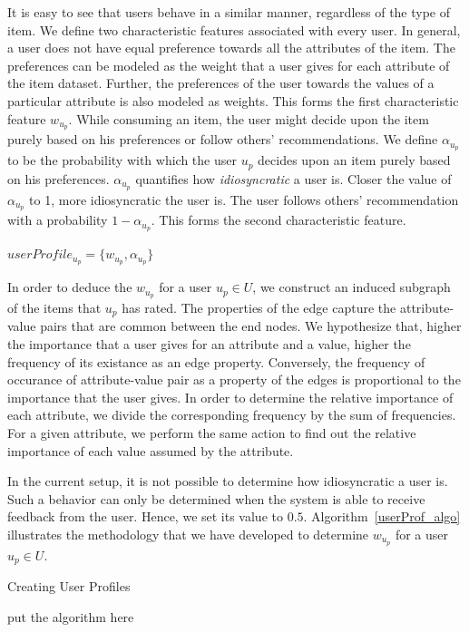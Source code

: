\documentclass{acm_proc_article-sp}
\begin{document}
It is easy to see that users behave in a similar manner, regardless of the type of item. We define two characteristic features associated with every user. In general, a user does not have equal preference towards all the attributes of the item. The preferences can be modeled as the weight that a user gives for each attribute of the item dataset. Further, the preferences of the user towards the values of a particular attribute is also modeled as weights. This forms the first characteristic feature $w_{u_p}$. While consuming an item, the user might decide upon the item purely based on his preferences or follow others' recommendations. We define $\alpha_{u_p}$ to be the probability with which the user $u_p$ decides upon an item purely based on his preferences. $\alpha_{u_p}$ quantifies how \emph{idiosyncratic} a user is. Closer the value of $\alpha_{u_p}$ to 1, more idiosyncratic the user is. The user follows others' recommendation with a probability $1-\alpha_{u_p}$. This forms the second characteristic 
feature.

$userProfile_{u_p} = \{w_{u_p}, \alpha_{u_p}\}$

In order to deduce the $w_{u_p}$ for a user $u_p \in U$, we construct an induced subgraph of the items that $u_p$ has rated. The properties of the edge capture the attribute-value pairs that are common between the end nodes. We hypothesize that, higher the importance that a user gives for an attribute and a value, higher the frequency of its existance as an edge property. Conversely, the frequency of occurance of attribute-value pair as a property of the edges is proportional to the importance that the user gives. In order to determine the relative importance of each attribute, we divide the corresponding frequency by the sum of frequencies. For a given attribute, we perform the same action to find out the relative importance of each value assumed by the attribute.

In the current setup, it is not possible to determine how idiosyncratic a user is. Such a behavior can only be determined when the system is able to receive feedback from the user. Hence, we set its value to $0.5$. Algorithm~\ref{userProf_algo} illustrates the methodology that we have developed to determine $w_{u_p}$ for a user $u_p \in U$.


\begin{algorithm}
\label{userProf_algo}
\caption{Creating User Profiles}
\begin{algorithmic}[1]
  \STATE put the algorithm here
\end{algorithmic}
\end{algorithm}
\end{document}
